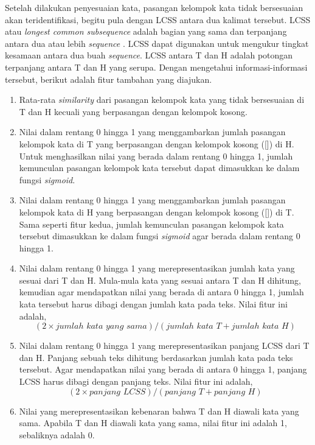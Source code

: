 	Setelah dilakukan penyesuaian kata, pasangan kelompok kata tidak bersesuaian akan teridentifikasi, begitu pula dengan LCSS antara dua kalimat tersebut. LCSS atau \textit{longest common subsequence} adalah bagian yang sama dan terpanjang antara dua atau lebih \textit{sequence} \citep{Paterson:1994:LCS:645723.666723}. LCSS dapat digunakan untuk mengukur tingkat kesamaan antara dua buah \textit{sequence}. LCSS antara T dan H adalah potongan terpanjang antara T dan H yang serupa. Dengan mengetahui informasi-informasi tersebut, berikut adalah fitur tambahan yang diajukan.	
	\begin{enumerate}
		\item Rata-rata \textit{similarity} dari pasangan kelompok kata yang tidak bersesuaian di T dan H kecuali yang berpasangan dengan kelompok kosong. 		
		\item Nilai dalam rentang 0 hingga 1 yang menggambarkan jumlah pasangan kelompok kata di T yang berpasangan dengan kelompok kosong ([]) di H. Untuk menghasilkan nilai yang berada dalam rentang 0 hingga 1, jumlah kemunculan pasangan kelompok kata tersebut dapat dimasukkan ke dalam fungsi \textit{sigmoid}.
		\item Nilai dalam rentang 0 hingga 1 yang menggambarkan jumlah pasangan kelompok kata di H yang berpasangan dengan kelompok kosong ([]) di T. Sama seperti fitur kedua, jumlah kemunculan pasangan kelompok kata tersebut dimasukkan ke dalam fungsi \textit{sigmoid} agar berada dalam rentang 0 hingga 1. 
		\item Nilai dalam rentang 0 hingga 1 yang merepresentasikan jumlah kata yang sesuai dari T dan H. Mula-mula kata yang sesuai antara T dan H dihitung, kemudian agar mendapatkan nilai yang berada di antara 0 hingga 1, jumlah kata tersebut harus dibagi dengan jumlah kata pada teks. Nilai fitur ini adalah,
		\begin{equation}
		(2 \times jumlah\,\,kata\,\,yang\,\,sama)/(jumlah\,\,kata\,\,T + jumlah\,\,kata\,\,H)
		\end{equation}
		\item Nilai dalam rentang 0 hingga 1 yang merepresentasikan panjang LCSS dari T dan H. Panjang sebuah teks dihitung berdasarkan jumlah kata pada teks tersebut. Agar mendapatkan nilai yang berada di antara 0 hingga 1, panjang LCSS harus dibagi dengan panjang teks. Nilai fitur ini adalah,
		\begin{equation}
			(2 \times panjang\,\,LCSS)/(panjang\,\,T + panjang\,\,H)
		\end{equation}		
		\item Nilai yang merepresentasikan kebenaran bahwa T dan H diawali kata yang sama. Apabila T dan H diawali kata yang sama, nilai fitur ini adalah 1, sebaliknya adalah 0.
	\end{enumerate}	
